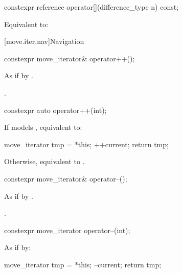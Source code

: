 %
\begin{itemdecl}
constexpr reference operator[](difference_type n) const;
\end{itemdecl}

\begin{itemdescr}
\pnum
\effects Equivalent to: 
\end{itemdescr}

[move.iter.nav]{Navigation}

%
\begin{itemdecl}
constexpr move_iterator& operator++();
\end{itemdecl}

\begin{itemdescr}
\pnum
\effects As if by .

\pnum
\returns {}.
\end{itemdescr}

%
\begin{itemdecl}
constexpr auto operator++(int);
\end{itemdecl}

\begin{itemdescr}
\pnum
\effects
If  models , equivalent to:
\begin{codeblock}
move_iterator tmp = *this;
++current;
return tmp;
\end{codeblock}
Otherwise, equivalent to .
\end{itemdescr}

%
\begin{itemdecl}
constexpr move_iterator& operator--();
\end{itemdecl}

\begin{itemdescr}
\pnum
\effects As if by .

\pnum
\returns {}.
\end{itemdescr}

%
\begin{itemdecl}
constexpr move_iterator operator--(int);
\end{itemdecl}

\begin{itemdescr}
\pnum
\effects
As if by:
\begin{codeblock}
move_iterator tmp = *this;
--current;
return tmp;
\end{codeblock}
\end{itemdescr}

